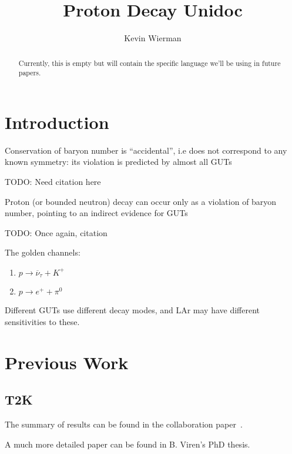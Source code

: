 \documentclass[journal, a4paper]{IEEEtran}
\begin{document}
	
	\title{Proton Decay Unidoc}
	\author{Kevin Wierman}
	\maketitle
	
	\begin{abstract}
		Currently, this is empty but will contain the specific language we'll be using in future papers.
	\end{abstract}
	
	\section{Introduction}
		Conservation of baryon number is “accidental”, i.e does not correspond to any known symmetry: its violation is predicted by almost all GUTs
		
	    TODO:  Need citation here

		Proton (or bounded neutron) decay can occur only as a violation of baryon number, pointing to an indirect evidence for GUTs

    TODO:  Once again, citation
    
    The golden channels:
    \begin{enumerate}
		\item  $p\rightarrow \overline \nu_\tau +K^+$    
		\item $p\rightarrow e^+ + \pi^0$
    \end{enumerate}
	Different GUTs use different decay modes, and LAr may have different sensitivities to these.
	
	\section{Previous Work}
		\subsection{T2K}

		The summary of results can be found in the collaboration paper~\cite{Collaboration1998}.
		
		A much more detailed paper can be found in B. Viren's PhD thesis\cite{Viren2000}.
		
\end{document}
